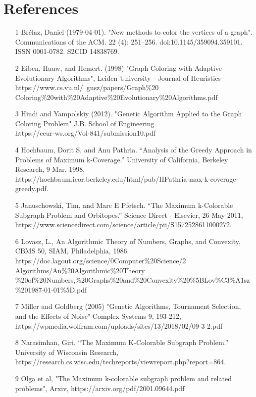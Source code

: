 \documentclass{article}
\begin{document}
 \section{References}
    \begin{itemize}
        \item [1] Brélaz, Daniel (1979-04-01). "New methods to color the vertices of a graph". Communications of the ACM. 22 (4): 251–256. doi:10.1145/359094.359101. ISSN 0001-0782. S2CID 14838769.
        \item [2] Eiben, Hauw, and Hemert. (1998) "Graph Coloring with Adaptive Evolutionary Algorithms", Leiden University - Journal of Heuristics
        \\https://www.cs.vu.nl/~gusz/papers/Graph\%20\\Coloring\%20with\%20Adaptive\%20Evolutionary\%20Algorithms.pdf
        \item [3] Hindi and Yampolskiy (2012). "Genetic Algorithm Applied to the Graph Coloring Problem" J.B. School of Engineering \\https://ceur-ws.org/Vol-841/submission\textunderscore10.pdf
        \item [4] Hochbaum, Dorit S, and Anu Pathria. “Analysis of the Greedy Approach in Problems of Maximum k-Coverage.” University of California, Berkeley Research, 9 Mar. 1998, https://hochbaum.ieor.berkeley.edu/html/pub/HPathria-max-k-coverage-greedy.pdf. 
        \item [5] Januschowski, Tim, and Marc E Pfetsch. “The Maximum k-Colorable Subgraph Problem and Orbitopes.” Science Direct - Elsevier, 26 May 2011, https://www.sciencedirect.com/science/article/pii/S1572528611000272. 
        \item [6] Lovasz, L., An Algorithmic Theory of Numbers, Graphs, and Convexity, \\
        CBMS 50, SIAM, Philadelphia, 1986.\\ https://doc.lagout.org/science/0\textunderscore Computer\%20Science/2\textunderscore \\ Algorithms/An\%20Algorithmic\%20Theory\\\%20of\%20Numbers,\%20Graphs\%20and\%20Convexity\%20\%5BLov\%C3\%A1sz\%201987-01-01\%5D.pdf
        \item [7] Miller and Goldberg (2005) "Genetic Algorithms, Tournament Selection, and the Effects of Noise" Complex Systems 9, 193-212, \\ https://wpmedia.wolfram.com/uploads/sites/13/2018/02/09-3-2.pdf
        \item [8] Narasimhan, Giri. “The Maximum K-Colorable Subgraph Problem.” University of Wisconsin Research, https://research.cs.wisc.edu/techreports/viewreport.php?report=864. 
        \item [9] Olga et al, "The Maximum k-colorable subgraph problem and related problems", Arxiv,  https://arxiv.org/pdf/2001.09644.pdf
    \end{itemize}
\end{document}
